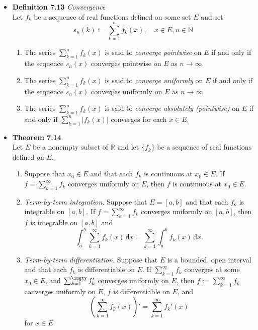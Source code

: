 \documentclass[11pt,a4paper]{article}
\begin{document}
\begin{itemize}

    \item \textbf{Definition 7.13} \emph{Convergence} \\
        Let $f_k$ be a sequence of real functions defined on some set $E$ and set
        \[
            s_n(k) := \sum_{k=1}^n f_k(x), \quad x \in E, n \in \mathbb{N}
        \]
        \begin{enumerate}
            \item The series $\sum_{k=1}^n f_k(x)$ is said to \emph{converge pointwise} on $E$
                if and only if the sequence $s_n(x)$ converges pointwise on $E$ as
                $n \to \infty$.
            \item The series $\sum_{k=1}^n f_k(x)$ is said to \emph{converge uniformly} on $E$
                if and only if the sequence $s_n(x)$ converges uniformly on $E$ as
                $n \to \infty$.
            \item The series $\sum_{k=1}^n f_k(x)$ is said to
                \emph{converge absolutely (pointwise)} on $E$ if and only if
                $\sum_{k=1}^n |f_k(x)|$ converges for each $x \in E$.
        \end{enumerate}


    \item \textbf{Theorem 7.14} \\
        Let $E$ be a nonempty subset of $\mathbb{R}$ and let $\{f_k\}$ be a sequence of real
        functions defined on $E$.
        \begin{enumerate}
            \item Suppose that $x_0 \in E$ and that each $f_k$ is continuous at $x_0 \in E$.
                If $f = \sum_{k=1}^\infty f_k$ converges uniformly on $E$, then $f$ is
                continuous at $x_0 \in E$.
            \item \emph{Term-by-term integration}.
                Suppose that $E = [a, b]$ and that each $f_k$ is integrable on $[a, b]$.
                If $f = \sum_{k=1}^\infty f_k$ converges uniformly on $[a, b]$, then $f$
                is integrable on $[a, b]$ and
                \[
                    \int_a^b \sum_{k=1}^\infty f_k(x)\, \mathrm{d}x =
                    \sum_{k=1}^\infty \int_a^b f_k(x)\, \mathrm{d}x.
                \]
            \item \emph{Term-by-term differentiation}.
                Suppose that $E$ is a bounded, open interval and that each $f_k$ is
                differentiable on $E$.
                If $\sum_{k=1}^\infty f_k$ converges at some $x_0 \in E$,
                and $\sum_{k=1}^\ingty f_k'$ converges uniformly on $E$,
                then $f := \sum_{k=1}^\infty f_k$ converges uniformly on $E$,
                $f$ is differentiable on $E$, and
                \[
                    \left( \sum_{k=1}^\infty f_k(x) \right)' =
                    \sum_{k=1}^\infty f_k'(x)
                \]
                for $x \in E$.
        \end{enumerate}


\end{itemize}
\end{document}

